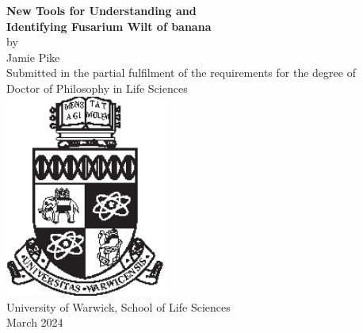 \begin{titlepage}
    \begin{center}
        \singlespacing
        \Huge
        \textbf{New Tools for Understanding and } \\
        \vspace*{0.5cm}
        \textbf{Identifying Fusarium Wilt of banana} \\
        \vspace*{1.8cm}
        \normalsize
        by \\ 
        \vspace*{0.2cm}
        \LARGE
        Jamie Pike\\ 
        \vfill
        \normalsize
        Submitted in the partial fulfilment of the requirements for the degree of \\
        \Large
        \vspace*{0.3cm}
        Doctor of Philosophy in Life Sciences \\
        \vspace*{1cm}
        \includegraphics[width=0.4\textwidth]{Preamble/crest_black.eps} \\
        \vspace*{1cm}
        \large
        University of Warwick, School of Life Sciences\\
        \vspace*{0.5cm}
        \normalsize
        March 2024 \\
         \vspace*{1cm}   
    \end{center}
    \clearpage
\end{titlepage}